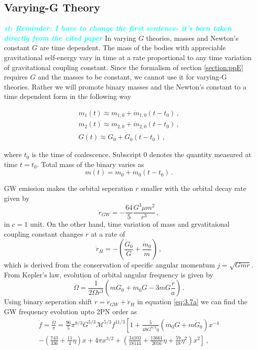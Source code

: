 \documentclass[prd,twocolumn,nofootinbib]{revtex4-1}
\newcommand{\st}[1]{\textcolor{cyan}{\it{\textbf{st: #1}}} }
\begin{document}
 \subsection{Varying-G Theory}\label{gdot}
\st{Reminder: I have to change the first sentence- it's been taken directly from the cited paper}In varying $G$ theories, masses and Newton's constant $G$ are time dependent. The mass of the bodies with appreciable gravitational self-energy vary in time at a rate proportional to any time variation of gravitational coupling constant\cite{PhysRevLett.65.953}. Since the formalism of section \ref{section:ppE} requires $G$ and the masses to be constant, we cannot use it for varying-G theories. Rather we will promote binary masses and the Newton's constant to a time dependent form in the following way
 
 \begin{eqnarray}\label{eq:3.7a2}
 m_1(t)\approx m_{1,0}+\dot{m}_{1,0}(t-t_0)\,, \\
 \label{eq:3.7a3}  m_2(t)\approx m_{2,0}+\dot{m}_{2,0}(t-t_0)\,, \\
   \label{eq:3.7a4}  G(t)\approx  G_0+\dot{G}_0(t-t_0)\, , 
 \end{eqnarray}
 
 where $t_0$ is the time of coalescence. Subscript $0$ denotes the quantity measured at time $t=t_0$. Total mass of the binary varies as
 \begin{equation}
 m(t)=m_0+\dot{m}_0(t-t_0)\,.
 \end{equation}
 
 \hspace*{15.5pt}GW emission makes the orbital seperation $r$ smaller with the orbital decay rate given by \cite{PhysRevD.49.2658}
 \begin{equation}
 \dot{r}_{GW}=-\frac{64}{5}\frac{G^3 \mu m^2}{r^3}\,,
 \end{equation}
 in $c=1$ unit. On the other hand, time variation of mass and grvatitaional coupling constant changes $r$ at a rate of 
 \begin{equation}
 \dot{r}_H=-\left(\frac{\dot{G}_0}{G}+\frac{\dot{m}_0}{m}\right)\,,
 \end{equation}
 which is derived from the conservation of specific angular momentum $j=\sqrt{Gmr}$. From Kepler's law, evolution of orbital angular frequency is given by
 \begin{equation}\label{eq:3.7a}
 \dot{\Omega}=\frac{1}{2\Omega r^3}\left(m\dot{G}_0+\dot{m}_0G-3mG\frac{\dot{r}}{a}\right)\,.
 \end{equation}
 \hspace*{15.5pt} Using binary seperation shift $\dot{r}=\dot{r}_{GW}+\dot{r}_H$ in equation \eqref{eq:3.7a} we can find the GW frequency evolution upto 2PN order as
\begin{align} \label{eq:3.7b}
 \dot{f}=\frac{\dot{\Omega}}{\pi}=\frac{96}{5}\pi^{8/3}G^{5/3}\mathcal{M}^{5/3}f^{11/3}\left[1+\frac{5}{48 G^{8/3}\eta}(\dot{m}_0G+m\dot{G}_0)x^{-4} \right. \nonumber\\ \left.  -\left(\frac{743}{336}+\frac{11}{4}\eta\right)x+4\pi x^{3/2}+\left(\frac{34103}{18144}+\frac{13661}{2016}\eta+\frac{59}{18}\eta^2\right)x^2 \right]\,,
 \end{align}
 
\end{document}
